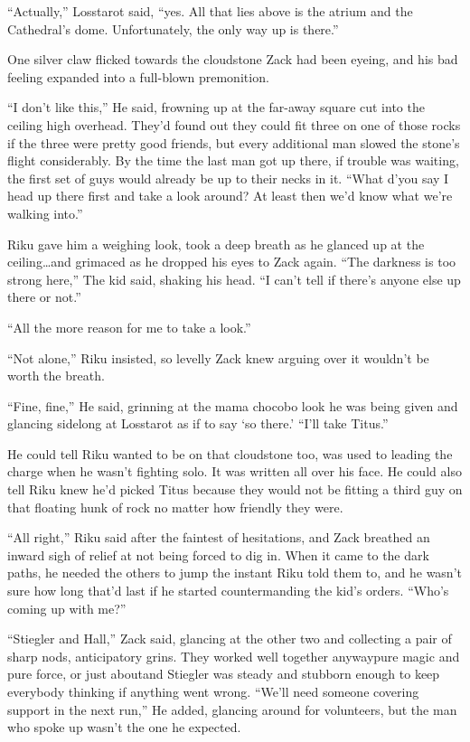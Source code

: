 ``Actually,'' Losstarot said, ``yes. All that lies above is the atrium and the Cathedral's dome. Unfortunately, the only way up is there.''

One silver claw flicked towards the cloudstone Zack had been eyeing, and his bad feeling expanded into a full-blown premonition.

``I don't like this,'' He said, frowning up at the far-away square cut into the ceiling high overhead. They'd found out they could fit three on one of those rocks if the three were pretty good friends, but every additional man slowed the stone's flight considerably. By the time the last man got up there, if trouble was waiting, the first set of guys would already be up to their necks in it. ``What d'you say I head up there first and take a look around? At least then we'd know what we're walking into.''

Riku gave him a weighing look, took a deep breath as he glanced up at the ceiling\ldots and grimaced as he dropped his eyes to Zack again. ``The darkness is too strong here,'' The kid said, shaking his head. ``I can't tell if there's anyone else up there or not.''

``All the more reason for me to take a look.''

``Not alone,'' Riku insisted, so levelly Zack knew arguing over it wouldn't be worth the breath.

``Fine, fine,'' He said, grinning at the mama chocobo look he was being given and glancing sidelong at Losstarot as if to say `so there.' ``I'll take Titus.''

He could tell Riku wanted to be on that cloudstone too, was used to leading the charge when he wasn't fighting solo. It was written all over his face. He could also tell Riku knew he'd picked Titus because they would not be fitting a third guy on that floating hunk of rock no matter how friendly they were.

``All right,'' Riku said after the faintest of hesitations, and Zack breathed an inward sigh of relief at not being forced to dig in. When it came to the dark paths, he needed the others to jump the instant Riku told them to, and he wasn't sure how long that'd last if he started countermanding the kid's orders. ``Who's coming up with me?''

``Stiegler and Hall,'' Zack said, glancing at the other two and collecting a pair of sharp nods, anticipatory grins. They worked well together anyway\textemdash pure magic and pure force, or just about\textemdash and Stiegler was steady and stubborn enough to keep everybody thinking if anything went wrong. ``We'll need someone covering support in the next run,'' He added, glancing around for volunteers, but the man who spoke up wasn't the one he expected.

